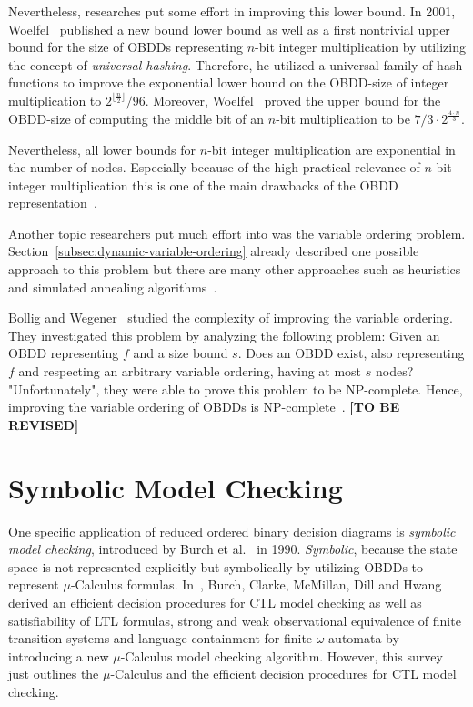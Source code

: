 \documentclass{vldb}
\newcommand{\tbr}{\textbf{[TO BE REVISED]}}
\begin{document}
Nevertheless, researches put some effort in improving this lower bound. In 2001,
Woelfel~\cite{WOELFEL01} published a new bound lower bound as well as a first 
nontrivial upper bound for the size of OBDDs representing $n$-bit integer
multiplication by utilizing the concept of \textit{universal hashing}. Therefore,
he utilized a universal family of hash functions to improve the exponential lower
bound on the OBDD-size of integer multiplication to
$2^{\lfloor\frac{n}{2}\rfloor}/96$. Moreover, Woelfel~\cite{WOELFEL01} proved
the upper bound for the OBDD-size of computing the middle bit of an $n$-bit
multiplication to be $7/3 \cdot 2^{\frac{4 \cdot n}{3}}$.

Nevertheless, all lower bounds for $n$-bit integer multiplication are exponential
in the number of nodes. Especially because of the high practical relevance of
$n$-bit integer multiplication this is one of the main drawbacks of the OBDD
representation~\cite{BRYANT86, BRYANT91, WOELFEL01}.

Another topic researchers put much effort into was the variable ordering problem.
Section~\ref{subsec:dynamic-variable-ordering} already described one possible
approach to this problem but there are many other approaches such as heuristics
and simulated annealing algorithms~\cite{BOLLIG96}.

Bollig and Wegener~\cite{BOLLIG96} studied the complexity of improving the
variable ordering. They investigated this problem by analyzing the following
problem: Given an OBDD representing $f$ and a size bound $s$. Does an OBDD exist,
also representing $f$ and respecting an arbitrary variable ordering, having at
most $s$ nodes? "Unfortunately", they were able to prove this problem to be 
NP-complete. Hence, improving the variable ordering of OBDDs is
NP-complete~\cite{BOLLIG96}. \tbr

\section{Symbolic Model Checking}
\label{sec:symbolic-model-checking}

One specific application of reduced ordered binary decision diagrams is 
\textit{symbolic model checking}, introduced by Burch et al.~\cite{BURCH90} in
1990. \textit{Symbolic}, because the state space is not represented explicitly
but symbolically by utilizing OBDDs to represent $\mu$-Calculus formulas.
In~\cite{BURCH90}, Burch, Clarke, McMillan, Dill and Hwang derived an efficient
decision procedures for CTL model checking as well as satisfiability of LTL
formulas, strong and weak observational equivalence of finite transition systems
and language containment for finite $\omega$-automata by introducing a new
$\mu$-Calculus model checking algorithm. However, this survey just outlines the
$\mu$-Calculus and the efficient decision procedures for CTL model checking.
\end{document}
